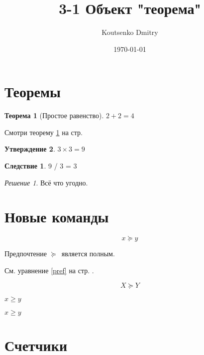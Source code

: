 \documentclass[a4paper,12pt]{article}                       %
\title{3-1 Объект "теорема"}
\author{Koutsenko Dmitry}
\date{\today}
\theoremstyle{plain}                                        %
\newtheorem{theorem}{Теорема}[section]
\newtheorem{proposition}[theorem]{Утверждение}
\theoremstyle{definition}                                   %
\newtheorem{corollary}{Следствие}[theorem]
\theoremstyle{remark}                                       %
\newtheorem*{nonum}{Решение}
\begin{document}

\maketitle

\section{Теоремы}

\begin{theorem}[Простое равенство]\label{theorem1}
    $2+2=4$
\end{theorem}

Смотри теорему \ref{theorem1} на стр. \pageref{theorem1}

\begin{proposition}
    $3\times 3 = 9$
\end{proposition}

\begin{corollary}
    9 / 3 = 3
\end{corollary}

\begin{nonum}
    Всё что угодно.
\end{nonum}


\section{Новые команды}

\newcommand{\nw}{\ensuremath{\succcurlyeq}}

\begin{equation}\label{pref}
    x \nw y
\end{equation}

Предпочтение \nw\ является полным.

\newcommand{\str}[1]{%
    на стр. \pageref{#1}%
}

См. уравнение \eqref{pref} \str{pref}.

\newcommand{\qwerty}[2][X]{%
    \begin{equation}
        #1 \nw #2
    \end{equation}
}

\qwerty{Y}

$x \ge y$

\renewcommand{\ge}{\geqslant}

$x \ge y$

\section{Счетчики}
\end{document}
